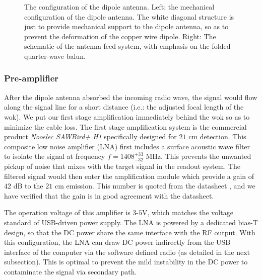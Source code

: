 \documentclass[12pt]{article}
\begin{document}
\begin{figure}
\begin{subfigure}[b]{0.45\textwidth}
        \end{subfigure}
        \caption{The configuration of the dipole antenna. Left: the mechanical configuration of the dipole antenna. The white diagonal structure is just to provide mechanical support to the dipole antenna, so as to prevent the deformation of the copper wire dipole. Right: The schematic of the antenna feed system, with emphasis on the folded quarter-wave balun.}
	    \label{fig: dipole-antenna}
	\end{figure}    
     
    \subsubsection{Pre-amplifier}
    After the dipole antenna absorbed the incoming radio wave, the signal would flow along the signal line for a short distance (i.e.: the adjusted focal length of the wok).
    We put our first stage amplification immediately behind the wok so as to minimize the cable loss.
    The first stage amplification system is the commercial product \textit{Nooelec SAWBird+ H1} specifically designed for $21$ cm detection. 
    This composite low noise amplifier (LNA) first includes a surface acoustic wave filter to isolate the signal at frequency $f = 1408_{-32}^{+33}$ MHz.
    This prevents the unwanted pickup of noise that mixes with the target signal in the readout system.
    The filtered signal would then enter the amplification module which provide a gain of {$42$ dB} to the $21$ cm emission. 
    This number is quoted from the datasheet \cite{sawbird-amp-datasheet}, and we have verified that the gain is in good agreement with the datasheet. 

    The operation voltage of this amplifier is $3$-$5$V, which matches the voltage standard of USB-driven power supply.
    The LNA is powered by a dedicated bias-T design, so that the DC power share the same interface with the RF output. 
    With this configuration, the LNA can draw DC power indirectly from the USB interface of the computer via the software defined radio (as detailed in the next subsection).
    This is optimal to prevent the mild instability in the DC power to contaminate the signal via secondary path.
    
\end{document}
